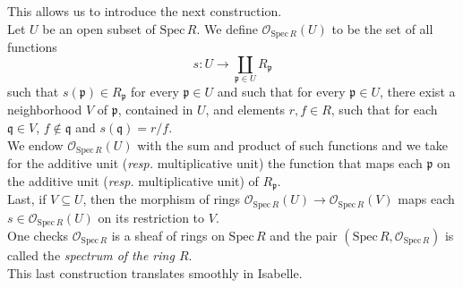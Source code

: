 \documentclass[12pt]{scrartcl}
\def\spec{\text{Spec}\,R}
\begin{document}
This allows us to introduce the next construction.	\\
Let $U$ be an open subset of $\text{Spec}\,R$. We define $\mathscr{O}_{\spec} (U)$ to be the set of all functions 
	\[
	s: U \rightarrow \coprod \limits_{\mathfrak{p} \in U} R_{\mathfrak{p}}
	\]
such that $s(\mathfrak{p}) \in R_{\mathfrak{p}}$ for every $\mathfrak{p} \in U$ and such that for every $\mathfrak{p} \in U$, there exist a neighborhood $V$ of $\mathfrak{p}$, contained in $U$, and elements $r, f \in R$, such that for each $\mathfrak{q} \in V$, $f \notin \mathfrak{q}$ and $s(\mathfrak{q}) = r/f$. \\
We endow $\mathscr{O}_{\spec} (U)$ with the sum and product of such functions and we take for the additive unit (\textit{resp.} multiplicative unit) the function that maps each $\mathfrak{p}$ on the additive unit (\textit{resp.} multiplicative unit) of $R_{\mathfrak{p}}$. \\
Last, if $V \subseteq U$, then the morphism of rings $\mathscr{O}_{\spec} (U) \rightarrow \mathscr{O}_{\spec} (V)$ maps each $s \in \mathscr{O}_{\spec} (U)$ on its restriction to $V$. \\
One checks $\mathscr{O}_{\spec} $ is a sheaf of rings on $\text{Spec}\,R$ and the pair $(\text{Spec}\,R, \mathscr{O}_{\spec} )$ is called the \emph{spectrum of the ring $R$}. \\
This last construction translates smoothly in Isabelle. 

\end{document}
